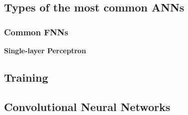 \clearpage
\subsection{Types of the most common ANNs}


\subsubsection*{Common FNNs}

\textbf{Single-layer Perceptron} 


\subsection{Training}



\newpage
\subsection{Convolutional Neural Networks}
\newpage

